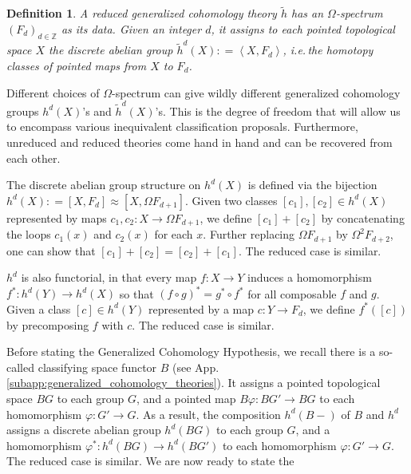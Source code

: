 \documentclass[sort&compress]{elsarticle}
\theoremstyle{theoremstyle}
\theoremstyle{framedtheoremstyle}
\theoremstyle{definitionstyle}
\newtheorem{dfn}[nul]{Definition}%
\theoremstyle{definitionstyle}
\theoremstyle{definitionstyle}
\theoremstyle{definitionstyle}
\theoremstyle{nameddefinitionstyle}
\theoremstyle{framednameddefinitionstyle}
\theoremstyle{proofstyle}
\theoremstyle{definitionstyle}
\newcommand{\fromto}{\rightarrow}
\newcommand{\ZZZ}{\mathbb{Z}}
\newcommand{\coloneq}{\mathrel{\mathop:}=}
\newcommand{\paren}[1]{\left( #1 \right)}
\newcommand{\angles}[1]{\left\langle #1 \right\rangle}
\newcommand{\brackets}[1]{\left[ #1 \right]}
\begin{document}
\begin{dfn}
A reduced generalized cohomology theory $\tilde h$ has an $\Omega$-spectrum $\paren{F_d}_{d\in \ZZZ}$ as its data. Given an integer $d$, it assigns to each pointed topological space $X$ the discrete abelian group $\tilde h^d(X) \coloneq \angles{X, F_d}$, i.e.\,the homotopy classes of pointed maps from $X$ to $F_d$.\label{dfn:reduced_generalized_cohomology_theory}
\end{dfn}

Different choices of $\Omega$-spectrum can give wildly different generalized cohomology groups $h^d(X)$'s and $\tilde h^d(X)$'s. This is the degree of freedom that will allow us to encompass various inequivalent classification proposals. Furthermore, unreduced and reduced theories come hand in hand and can be recovered from each other.

The discrete abelian group structure on $h^d(X)$ is defined via the bijection $h^d(X) \coloneq \brackets{X, F_d} \approx \brackets{X, \Omega F_{d+1}}$.
Given two classes $\brackets{c_1}, \brackets{c_2}\in h^d(X)$ represented by maps $c_1, c_2: X \fromto \Omega F_{d+1}$, we define $\brackets{c_1}+\brackets{c_2}$ by concatenating the loops $c_1(x)$ and $c_2(x)$ for each $x$.
Further replacing $\Omega F_{d+1}$ by $\Omega^2 F_{d+2}$, one can show that $\brackets{c_1}+\brackets{c_2} = \brackets{c_2} + \brackets{c_1}$. The reduced case is similar.

$h^d$ is also functorial, in that every map $f: X \fromto Y$ induces a homomorphism $f^*: h^d(Y) \fromto h^d(X)$ so that $\paren{f\circ g}^\ast = g^\ast \circ f^\ast$ for all composable $f$ and $g$. Given a class $\brackets{c}\in h^d(Y)$ represented by a map $c: Y \fromto F_d$, we define $f^\ast\paren{\brackets c}$ by precomposing $f$ with $c$. The reduced case is similar.

Before stating the Generalized Cohomology Hypothesis, we recall there is a so-called classifying space functor $B$ (see App.\,\ref{subapp:generalized_cohomology_theories}). It assigns a pointed topological space $BG$ to each group $G$, and a pointed map $B\varphi: BG'\fromto BG$ to each homomorphism $\varphi: G'\fromto G$. As a result, the composition $h^d(B-)$ of $B$ and $h^d$ assigns a discrete abelian group $h^d(BG)$ to each group $G$, and a homomorphism $\varphi^*: h^d(BG)\fromto h^d(BG')$ to each homomorphism $\varphi:G'\fromto G$. The reduced case is similar.
We are now ready to state the
\end{document}
